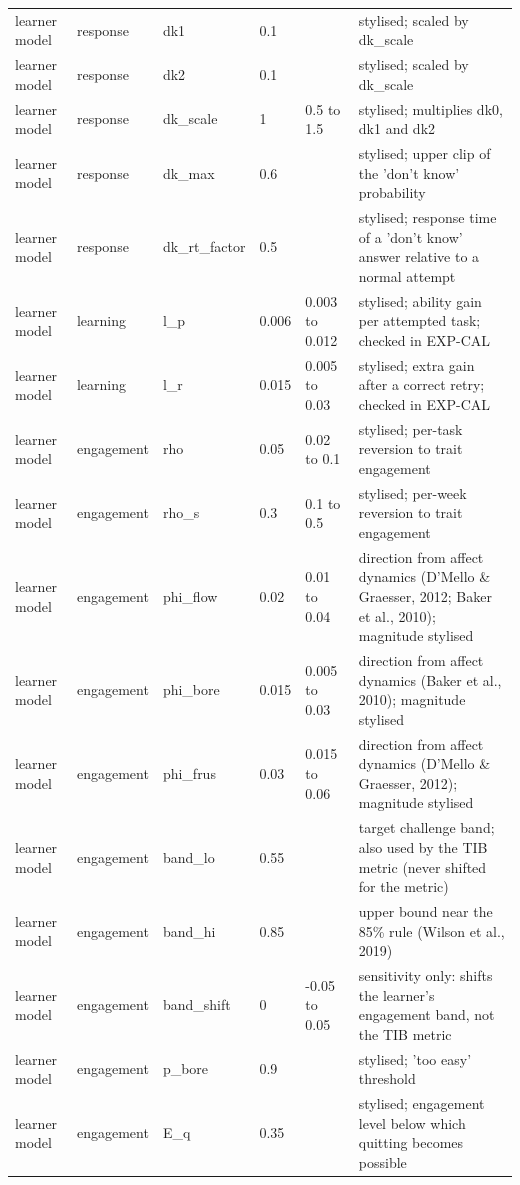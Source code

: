 \begin{table}[H]
\begin{tabular}{llllll}
learner model & response & dk1 & 0.1 &  & stylised; scaled by dk\_scale \\
learner model & response & dk2 & 0.1 &  & stylised; scaled by dk\_scale \\
learner model & response & dk\_scale & 1 & 0.5 to 1.5 & stylised; multiplies dk0, dk1 and dk2 \\
learner model & response & dk\_max & 0.6 &  & stylised; upper clip of the 'don't know' probability \\
learner model & response & dk\_rt\_factor & 0.5 &  & stylised; response time of a 'don't know' answer relative to a normal attempt \\
learner model & learning & l\_p & 0.006 & 0.003 to 0.012 & stylised; ability gain per attempted task; checked in EXP-CAL \\
learner model & learning & l\_r & 0.015 & 0.005 to 0.03 & stylised; extra gain after a correct retry; checked in EXP-CAL \\
learner model & engagement & rho & 0.05 & 0.02 to 0.1 & stylised; per-task reversion to trait engagement \\
learner model & engagement & rho\_s & 0.3 & 0.1 to 0.5 & stylised; per-week reversion to trait engagement \\
learner model & engagement & phi\_flow & 0.02 & 0.01 to 0.04 & direction from affect dynamics (D'Mello \& Graesser, 2012; Baker et al., 2010); magnitude stylised \\
learner model & engagement & phi\_bore & 0.015 & 0.005 to 0.03 & direction from affect dynamics (Baker et al., 2010); magnitude stylised \\
learner model & engagement & phi\_frus & 0.03 & 0.015 to 0.06 & direction from affect dynamics (D'Mello \& Graesser, 2012); magnitude stylised \\
learner model & engagement & band\_lo & 0.55 &  & target challenge band; also used by the TIB metric (never shifted for the metric) \\
learner model & engagement & band\_hi & 0.85 &  & upper bound near the 85\% rule (Wilson et al., 2019) \\
learner model & engagement & band\_shift & 0 & -0.05 to 0.05 & sensitivity only: shifts the learner's engagement band, not the TIB metric \\
learner model & engagement & p\_bore & 0.9 &  & stylised; 'too easy' threshold \\
learner model & engagement & E\_q & 0.35 &  & stylised; engagement level below which quitting becomes possible \\

\end{tabular}
\end{table}
